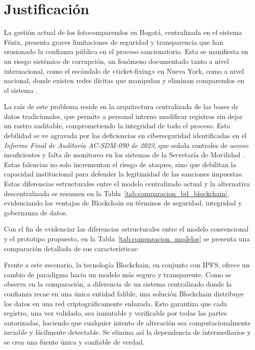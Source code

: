 \section{\large Justificación}
La gestión actual de los fotocomparendos en Bogotá, centralizada en el sistema Fénix, presenta graves limitaciones de seguridad y transparencia que han erosionado la confianza pública en el proceso sancionatorio. Esta se manifiesta en un riesgo sistémico de corrupción, un fenómeno documentado tanto a nivel internacional, como el escándalo de «ticket-fixing» en Nueva York, como a nivel nacional, donde existen redes ilícitas que manipulan y eliminan comparendos en el sistema \parencite{barbaro2011ticketfixing, blogAletta, procuraduriaBucaramanga}.

La raíz de este problema reside en la arquitectura centralizada de las bases de datos tradicionales, que permite a personal interno modificar registros sin dejar un rastro auditable, comprometiendo la integridad de todo el proceso. Esta debilidad se ve agravada por las deficiencias en ciberseguridad identificadas en el \textit{Informe Final de Auditoría AC-SDM-090 de 2023}, que señala controles de acceso insuficientes y falta de monitoreo en los sistemas de la Secretaría de Movilidad \parencite{auditoriaSDM}. Estas falencias no solo incrementan el riesgo de ataques, sino que debilitan la capacidad institucional para defender la legitimidad de las sanciones impuestas.
Estas diferencias estructurales entre el modelo centralizado actual y la alternativa descentralizada se resumen en la Tabla~\ref{tab:comparacion_bd_blockchain}, evidenciando las ventajas de Blockchain en términos de seguridad, integridad y gobernanza de datos.

Con el fin de evidenciar las diferencias estructurales entre el modelo convencional y el prototipo propuesto, en la Tabla~\ref{tab:comparacion_modelos} se presenta una comparación detallada de sus características:



Frente a este escenario, la tecnología Blockchain, en conjunto con IPFS, ofrece un cambio de paradigma hacia un modelo más seguro y transparente. Como se observa en la comparación, a diferencia de un sistema centralizado donde la confianza recae en una única entidad falible, una solución Blockchain distribuye los datos en una red criptográficamente enlazada. Esto garantiza que cada registro, una vez validado, sea inmutable y verificable por todas las partes autorizadas, haciendo que cualquier intento de alteración sea computacionalmente inviable y fácilmente detectable. Se elimina así la dependencia de intermediarios y se crea una fuente única y confiable de verdad.


